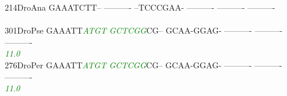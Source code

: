 \documentclass[11pt,twoside,reqno,a4paper]{article}
\begin{document}
{214\hspace*{1\charwidth}DroAna	GAAATCTT--	----------	--TCCCGAA-	----------	----------	----------	\\
\hspace*{4\charwidth}\hspace*{7\charwidth}\hspace*{1\charwidth}\hspace*{1\charwidth}\hspace*{1\charwidth}\hspace*{1\charwidth}\hspace*{1\charwidth}\hspace*{1\charwidth}\\
301\hspace*{1\charwidth}DroPse	GAAATT\textit{\textcolor{Green}{A}}\textit{\textcolor{Green}{T}}\textit{\textcolor{Green}{G}}\textit{\textcolor{Green}{T}}	\textit{\textcolor{Green}{G}}\textit{\textcolor{Green}{C}}\textit{\textcolor{Green}{T}}\textit{\textcolor{Green}{C}}\textit{\textcolor{Green}{G}}\textit{\textcolor{Green}{G}}CG--	GCAA-GGAG-	----------	----------	----------	\\
\hspace*{4\charwidth}\hspace*{7\charwidth}\hspace*{6\charwidth}\textit{\textcolor{Green}{11.0}}\hspace*{1\charwidth}\hspace*{1\charwidth}\hspace*{1\charwidth}\hspace*{1\charwidth}\hspace*{1\charwidth}\hspace*{1\charwidth}\\
276\hspace*{1\charwidth}DroPer	GAAATT\textit{\textcolor{Green}{A}}\textit{\textcolor{Green}{T}}\textit{\textcolor{Green}{G}}\textit{\textcolor{Green}{T}}	\textit{\textcolor{Green}{G}}\textit{\textcolor{Green}{C}}\textit{\textcolor{Green}{T}}\textit{\textcolor{Green}{C}}\textit{\textcolor{Green}{G}}\textit{\textcolor{Green}{G}}CG--	GCAA-GGAG-	----------	----------	----------	\\
\hspace*{4\charwidth}\hspace*{7\charwidth}\hspace*{6\charwidth}\textit{\textcolor{Green}{11.0}}\hspace*{1\charwidth}\hspace*{1\charwidth}\hspace*{1\charwidth}\hspace*{1\charwidth}\hspace*{1\charwidth}\hspace*{1\charwidth}\\
}
\end{document}
